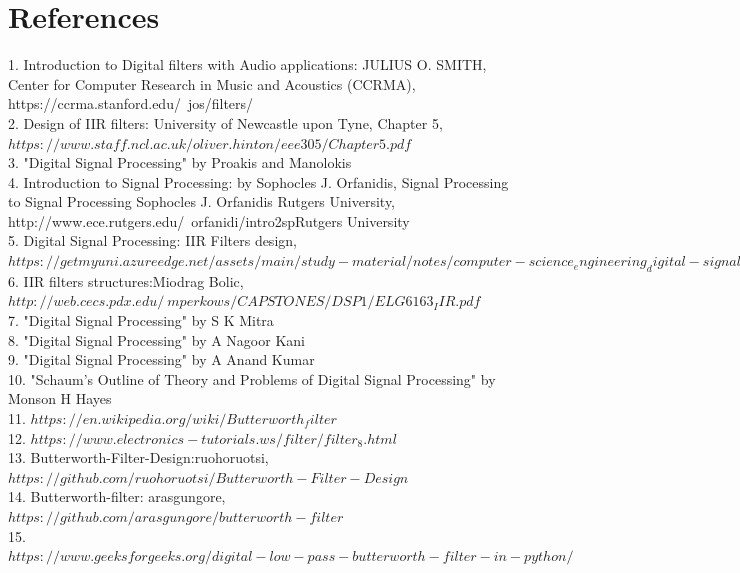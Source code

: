 \documentclass[journal,10pt,twocolumn]{article}
\begin{document}
\section{References}
\begin{flushleft}
    

\vspace{0.2cm}
1. Introduction to Digital filters with Audio applications: JULIUS O. SMITH, Center for Computer Research in Music and Acoustics (CCRMA), https://ccrma.stanford.edu/~jos/filters/ \\
\vspace{0.25cm}
2. Design of IIR filters: University of Newcastle upon Tyne, Chapter 5, $https://www.staff.ncl.ac.uk/oliver.hinton/eee305/Chapter5.pdf$\\
\vspace{0.25cm}
3. "Digital Signal Processing" by Proakis and Manolokis\\
\vspace{0.25cm}
4. Introduction to Signal Processing: by Sophocles J. Orfanidis, Signal Processing to Signal Processing Sophocles J. Orfanidis Rutgers University, http://www.ece.rutgers.edu/~orfanidi/intro2spRutgers University\\
\vspace{0.25cm}
5. Digital Signal Processing: IIR Filters design, $https://getmyuni.azureedge.net/assets/main/study-material/notes/computer-science_engineering_digital-signal-processing_iir-filter-design_notes.pdf$\\
\vspace{0.20cm}
6. IIR filters structures:Miodrag Bolic, $http://web.cecs.pdx.edu/~mperkows/CAPSTONES/DSP1/ELG6163_IIR.pdf$\\
\vspace{0.25cm}
7. "Digital Signal Processing" by S K Mitra\\
\vspace{0.25cm}
8. "Digital Signal Processing" by A Nagoor Kani\\
\vspace{0.25cm}
9. "Digital Signal Processing" by A Anand Kumar\\
\vspace{0.25cm}
10. "Schaum's Outline of Theory and Problems of Digital Signal Processing" by Monson H Hayes\\
\vspace{0.25cm}
11. $https://en.wikipedia.org/wiki/Butterworth_filter$\\
\vspace{0.25cm}
12. $https://www.electronics-tutorials.ws/filter/filter_8.html$\\
\vspace{0.25cm}
13. Butterworth-Filter-Design:ruohoruotsi, $https://github.com/ruohoruotsi/Butterworth-Filter-Design$\\
\vspace{0.25cm}
14. Butterworth-filter: arasgungore, $https://github.com/arasgungore/butterworth-filter$\\
\vspace{0.25cm}
15. $https://www.geeksforgeeks.org/digital-low-pass-butterworth-filter-in-python/$\\
\vspace{0.25cm}
\end{flushleft}
\end{document}
